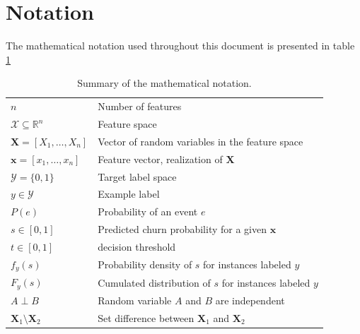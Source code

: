\section{Notation}

The mathematical notation used throughout this document is presented in table
\ref{tab:notation}

\begin{table}
    \centering
    \begin{tabular}{ll}
        \toprule
        $n$ & Number of features\\
        $\mathcal X\subseteq\mathbb R^n$ & Feature space\\
        $\bm X = [X_1,\dots,X_n]$ & Vector of random variables in the feature space\\
        $\bm x = [x_1,\dots,x_n]$ & Feature vector, realization of $\bm X$\\
        $\mathcal Y=\{0, 1\}$ & Target label space\\
        $y\in\mathcal Y$ & Example label \\
        $P(e)$ & Probability of an event $e$\\
        $s\in [0, 1]$ & Predicted churn probability for a given $\bm x$\\
        $t\in [0, 1]$ & decision threshold\\
        $f_y(s)$ & Probability density of $s$ for instances labeled $y$\\
        $F_y(s)$ & Cumulated distribution of $s$ for instances labeled $y$\\
        $A\perp B$ & Random variable $A$ and $B$ are independent\\
        $\bm X_1\setminus \bm X_2$ & Set difference between $\bm X_1$ and $\bm
        X_2$\\
        \bottomrule
    \end{tabular}
    \caption{Summary of the mathematical notation.}
    \label{tab:notation}
\end{table}
